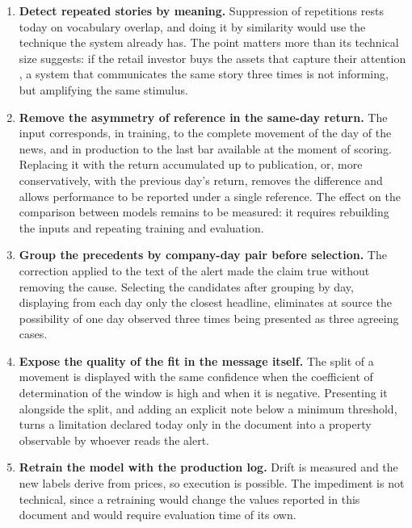 \begin{enumerate}
  \item \textbf{Detect repeated stories by meaning.} Suppression of repetitions rests today on
        vocabulary overlap, and doing it by similarity would use the technique the system already
        has. The point matters more than its technical size suggests: if the retail investor buys
        the assets that capture their attention \autocite{barber2008glitters}, a system that
        communicates the same story three times is not informing, but amplifying the same
        stimulus.

  \item \textbf{Remove the asymmetry of reference in the same-day return.} The input corresponds,
        in training, to the complete movement of the day of the news, and in production to the last
        bar available at the moment of scoring. Replacing it with the return accumulated up to
        publication, or, more conservatively, with the previous day's return, removes the difference
        and allows performance to be reported under a single reference. The effect on the comparison
        between models remains to be measured: it requires rebuilding the inputs and repeating
        training and evaluation.

  \item \textbf{Group the precedents by company-day pair before selection.} The correction applied
        to the text of the alert made the claim true without removing the cause. Selecting the
        candidates after grouping by day, displaying from each day only the closest headline,
        eliminates at source the possibility of one day observed three times being presented as
        three agreeing cases.

  \item \textbf{Expose the quality of the fit in the message itself.} The split of a movement is
        displayed with the same confidence when the coefficient of determination of the window is
        high and when it is negative. Presenting it alongside the split, and adding an explicit note
        below a minimum threshold, turns a limitation declared today only in the document into a
        property observable by whoever reads the alert.

  \item \textbf{Retrain the model with the production log.} Drift is measured and the new labels
        derive from prices, so execution is possible. The impediment is not technical, since a
        retraining would change the values reported in this document and would require evaluation
        time of its own.
\end{enumerate}

